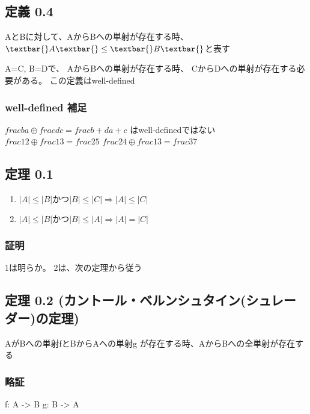 \documentclass[a4j,12pt]{jreport}
\begin{document}
\subsection{定義 0.4}\label{ux5b9aux7fa9-0.4}

\textbar{}A\textbar{}と\textbar{}B\textbar{}に対して、AからBへの単射が存在する時、
$\textbar{}A\textbar{} \leq \textbar{}B\textbar{} $と表す

\textbar{}A\textbar{}=\textbar{}C\textbar{},
\textbar{}B\textbar{}=\textbar{}D\textbar{}で、
AからBへの単射が存在する時、 CからDへの単射が存在する必要がある。
この定義はwell-defined

\subsubsection{well-defined 補足}\label{well-defined-ux88dcux8db3}

\(frac{b}{a} \oplus frac{d}{c} = frac{b+d}{a+c}\) はwell-definedではない
\(frac{1}{2} \oplus frac{1}{3} = frac{2}{5}\)
\(frac{2}{4} \oplus frac{1}{3} = frac{3}{7}\)

\subsection{定理 0.1}\label{ux5b9aux7406-0.1}

\begin{enumerate}
\def\labelenumi{\arabic{enumi}.}
\tightlist
\item
  \(|A| \leq |B| かつ |B| \leq |C| \Rightarrow |A| \leq |C|\)
\item
  \(|A| \leq |B| かつ |B| \leq |A| \Rightarrow |A| = |C|\)
\end{enumerate}

\subsubsection{証明}\label{ux8a3cux660e}

1は明らか。 2は、次の定理から従う

\subsection{定理 0.2
(カントール・ベルンシュタイン(シュレーダー)の定理)}\label{ux5b9aux7406-0.2-ux30abux30f3ux30c8ux30fcux30ebux30d9ux30ebux30f3ux30b7ux30e5ux30bfux30a4ux30f3ux30b7ux30e5ux30ecux30fcux30c0ux30fcux306eux5b9aux7406}

AがBへの単射fとBからAへの単射g が存在する時、AからBへの全単射が存在する

\subsubsection{略証}\label{ux7565ux8a3c}

f: A -\textgreater{} B g: B -\textgreater{} A
\end{document}
